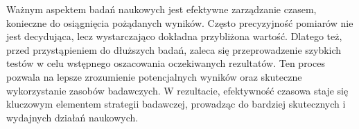 Ważnym aspektem badań naukowych jest efektywne zarządzanie czasem, konieczne do osiągnięcia pożądanych wyników.
Często precyzyjność pomiarów nie jest decydująca, lecz wystarczająco dokładna przybliżona wartość.
Dlatego też, przed przystąpieniem do dłuższych badań, zaleca się przeprowadzenie szybkich testów w celu wstępnego oszacowania oczekiwanych rezultatów.
Ten proces pozwala na lepsze zrozumienie potencjalnych wyników oraz skuteczne wykorzystanie zasobów badawczych.
W rezultacie, efektywność czasowa staje się kluczowym elementem strategii badawczej, prowadząc do bardziej skutecznych i wydajnych działań naukowych.